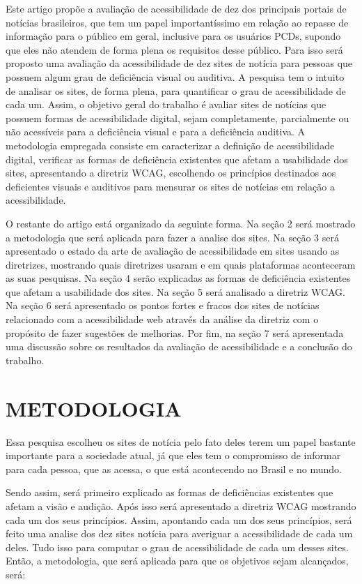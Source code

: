 \documentclass[a4paper]{article}
\begin{document}
\begin{titlepage}
Este artigo propõe a avaliação de acessibilidade de dez dos principais portais de notícias brasileiros, que tem um papel importantíssimo em relação ao repasse de informação para o público em geral, inclusive para os usuários PCDs, supondo que eles não atendem de forma plena os requisitos desse público. Para isso será proposto uma avaliação da acessibilidade de dez sites de notícia para pessoas que possuem algum grau de deficiência visual ou auditiva. A pesquisa tem o intuito de analisar os sites, de forma plena, para quantificar o grau de acessibilidade de cada um. Assim, o objetivo geral do trabalho é avaliar sites de notícias que possuem formas de acessibilidade digital, sejam completamente, parcialmente ou não acessíveis para a deficiência visual e para a deficiência auditiva. A metodologia empregada consiste em caracterizar a definição de acessibilidade digital, verificar as formas de deficiência existentes que afetam a usabilidade dos sites, apresentando a diretriz WCAG, escolhendo os princípios destinados aos deficientes visuais e auditivos para mensurar os sites de notícias em relação a acessibilidade.

O restante do artigo está organizado da seguinte forma. Na seção 2 será mostrado a metodologia que será aplicada para fazer a analise dos sites. Na seção 3 será apresentado o estado da arte de avaliação de acessibilidade em sites usando as diretrizes, mostrando quais diretrizes usaram e em quais plataformas aconteceram as suas pesquisas. Na seção 4 serão explicadas as formas de deficiência existentes que afetam a usabilidade dos sites. Na seção 5 será analisado a diretriz WCAG. Na seção 6 será apresentado os pontos fortes e fracos dos sites de notícias relacionado com a acessibilidade web através da análise da diretriz com o propósito de fazer sugestões de melhorias. Por fim, na seção 7 será apresentada uma discussão sobre os resultados da avaliação de acessibilidade e a conclusão do trabalho.

\section{METODOLOGIA}
Essa pesquisa escolheu os sites de notícia pelo fato deles terem um papel bastante importante para a sociedade atual, já que eles tem o compromisso de informar para cada pessoa, que as acessa, o que está acontecendo no Brasil e no mundo.

Sendo assim, será primeiro explicado as formas de deficiências existentes que afetam a visão e audição. Após isso será apresentado a diretriz WCAG mostrando cada um dos seus princípios. Assim, apontando cada um dos seus princípios, será feito uma analise dos dez sites notícia para averiguar a acessibilidade de cada um deles. Tudo isso para computar o grau de acessibilidade de cada um desses sites. Então, a metodologia, que será aplicada para que os objetivos sejam alcançados, será:


\end{titlepage}
\end{document}
